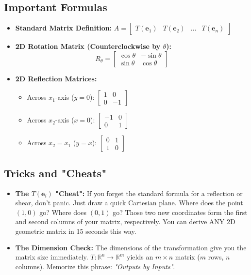 \documentclass[11pt]{article}
\begin{document}
\subsection{Important Formulas}
\begin{itemize}
    \item \textbf{Standard Matrix Definition:} $A = \begin{bmatrix} T(\mathbf{e}_1) & T(\mathbf{e}_2) & \dots & T(\mathbf{e}_n) \end{bmatrix}$
    \item \textbf{2D Rotation Matrix (Counterclockwise by $\theta$):} 
    \[ R_\theta = \begin{bmatrix} \cos\theta & -\sin\theta \\ \sin\theta & \cos\theta \end{bmatrix} \]
    \item \textbf{2D Reflection Matrices:}
    \begin{itemize}
        \item Across $x_1$-axis ($y=0$): $\begin{bmatrix} 1 & 0 \\ 0 & -1 \end{bmatrix}$
        \item Across $x_2$-axis ($x=0$): $\begin{bmatrix} -1 & 0 \\ 0 & 1 \end{bmatrix}$
        \item Across $x_2=x_1$ ($y=x$): $\begin{bmatrix} 0 & 1 \\ 1 & 0 \end{bmatrix}$
    \end{itemize}
\end{itemize}

\subsection{Tricks and "Cheats"}
\begin{itemize}
    \item \textbf{The $T(\mathbf{e}_i)$ "Cheat":} If you forget the standard formula for a reflection or shear, don't panic. Just draw a quick Cartesian plane. Where does the point $(1,0)$ go? Where does $(0,1)$ go? Those two new coordinates form the first and second columns of your matrix, respectively. You can derive ANY 2D geometric matrix in 15 seconds this way.
    \item \textbf{The Dimension Check:} The dimensions of the transformation give you the matrix size immediately. $T: \mathbb{R}^n \to \mathbb{R}^m$ yields an $m \times n$ matrix ($m$ rows, $n$ columns). Memorize this phrase: \textit{"Outputs by Inputs"}.
\end{itemize}
\end{document}
